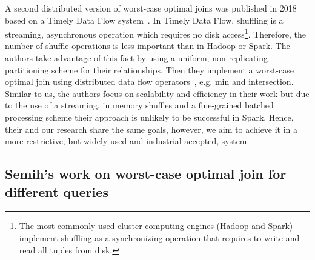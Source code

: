 A second distributed version of worst-case optimal joins was published in 2018 based on a Timely Data Flow system~\cite{ammar2018distributed,naiad}.
In Timely Data Flow, shuffling is a streaming, asynchronous operation which requires no disk access\footnote{The most commonly used cluster computing engines (Hadoop and Spark) implement shuffling as a synchronizing operation that requires to write and read all tuples from disk.}.
Therefore, the number of shuffle operations is less important than in Hadoop or Spark.
The authors take advantage of this fact by using a uniform, non-replicating partitioning scheme for their relationships.
Then they implement a worst-case optimal join using distributed data flow operators~\cite{naiad}, e.g. min and intersection.
Similar to us, the authors focus on scalability and efficiency in their work but due to the use of a streaming, in memory shuffles and a fine-grained batched processing scheme their approach is unlikely to be successful in Spark.
Hence, their and our research share the same goals, however, we aim to achieve it in a more restrictive, but widely used and industrial accepted, system.



\subsection{Semih's work on worst-case optimal join for different queries}\label{subsec:wcoj-binary-joins}



